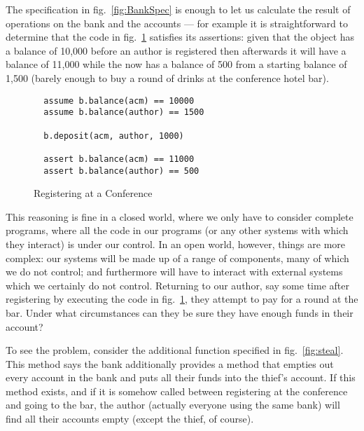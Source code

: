 
The specification in fig.~\ref{fig:BankSpec} is enough to let us
calculate the result of operations on the bank and the accounts ---
for example it is straightforward to determine that the code in
fig.~\ref{fig:rego} satisfies its assertions: given that the
 object has a balance of 10,000 before an author is
registered then afterwards it will have a balance of 11,000 while the
 now has a balance of 500 from a starting balance of 1,500
(barely enough to buy a round of drinks at the conference hotel bar).


\begin{figure}[tbp]
\begin{lstlisting}
  assume b.balance(acm) == 10000
  assume b.balance(author) == 1500

  b.deposit(acm, author, 1000)

  assert b.balance(acm) == 11000
  assert b.balance(author) == 500
\end{lstlisting}
\caption{Registering at a Conference}
\label{fig:rego}
\end{figure}


This reasoning is fine in a closed world, where we only have to
consider complete programs, where all the code in our programs (or any
other systems with which they interact) is under our control.   In an
open world, however, things are more complex: our systems will be made
up of a range of components, many of which we do not control; and
furthermore will have to interact with external systems which we
certainly do not control.  Returning to our author, say some time
after registering by executing the code in fig.~\ref{fig:rego}, they
attempt to pay for a round at the bar.  Under what circumstances can
they be sure they have enough funds in their account?

To see the problem, consider the additional function specified in
fig.~\ref{fig:steal}. This method says the bank additionally provides a
 method that empties out every account in the bank and puts
all their funds into the thief's account. If this method exists, and
if it is somehow called between registering at the conference and
going to the bar, the author (actually everyone using the same bank)
will find all their accounts empty (except the thief, of course).

